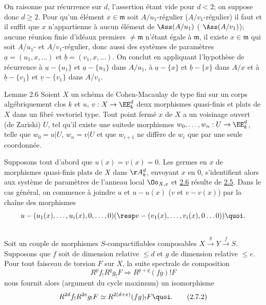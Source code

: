 On raisonne par récurrence sur $d$, l'assertion étant vide pour $d<2$;
on suppose donc $d\geq 2$. Pour qu'un élément $x\in \mathfrak{m}$ soit
$A/u_{1}$-régulier (\resp $A/v_{1}$-régulier) il faut et il
suffit que $x$ n'appartienne à aucun élément de $\Ass(A/u_{1})$ (\resp
$\Ass(A/v_{1})$); aucune réunion finie d'idéaux premiers $\neq \mathfrak{m}$
n'étant égale à $\mathfrak{m}$, il existe $x\in \mathfrak{m}$ qui soit $A/u_{1}$- et $A/v_{1}$-régulier, donc aussi des systèmes de paramètres
$\underline{a}=(u_{1},x,\ldots)$ et $\underline{b}=(v_{1},x,\ldots)$. On conclut en
appliquant l'hypothèse de récurrence à $\underline{u}-\{u_{1}\}$ et
$\underline{a}-\{u_{1}\}$ dans $A/u_{1}$, à $\underline{a}-\{x\}$ et
$\underline{b}-\{x\}$
dans $A/x$ et à $\underline{b}-\{v_{1}\}$ et $\underline{v}-\{v_{1}\}$ dans $A/v_{1}$.

\begin{enonce*}{Lemme 2.6}
Soient $X$ un schéma de Cohen-Macaulay de type fini sur un corps
algébriquement clos $k$ et $u$, $v:X\rightarrow \EE^{d}_{k}$
deux morphismes quasi-finis et plats de $X$ dans un fibré vectoriel
type. Tout point fermé $x$ de $X$ a un voisinage ouvert (de Zariski)
$U$, tel qu'il existe une suite\pageoriginale de morphismes
$w_{0},\ldots,w_{n}:U\rightarrow \EE^{d}_{k}$, telle que $w_{0}=u|U$,
$w_{n}=v|U$ et que $w_{i+1}$ ne diffère de $w_{i}$ que par une seule
coordonnée.
\end{enonce*}

Supposons tout d'abord que $u(x)=v(x)=0$. Les germes en $x$ de
morphismes quasi-finis plats de $X$ dans $\AA^{d}_{k}$,
envoyant $x$ en $0$, s'identifient alors aux système de paramètres de
l'anneau local $\Oo_{X,x}$ et \hyperref[XVIII.lem2.6]{2.6} résulte de
\hyperref[XVIII.lem2.5]{2.5}. Dans le cas
général, on commence à joindre $u$ et $u-u(x)$ (\resp $v$ et $v-v(x)$)
par la chaîne des morphismes
$$
u-(u_{1}(x),\ldots,u_{i}(x),0,\ldots,0)(\text{\resp}
v-(v_{1}(x),\ldots,v_{i}(x),0\ldots 0)){\quoi}.
$$

\setcounter{subsection}{6}
\subsection{}
Soit un couple de morphismes $S$-compactifiables composables
$X\xrightarrow{g} Y\xrightarrow{f}S$. Supposons que $f$ soit de
dimension relative $\leq d$ et $g$ de dimension relative $\leq
e$. Pour tout faisceau de torsion $F$ sur $X$, la suite spectrale de
composition
\begin{equation*}
R^{p}f_{!}R^{q}g_{!}F\Longrightarrow R^{p+q}(fg)!F\tag{2.7.1}
\end{equation*}%
nous fournit alors (argument du cycle maximum) un isomorphisme
\begin{equation*}
R^{2d}f_{!}R^{2e}g_{!}F\simeq R^{2(d+e)}(fg)_{!}F{\quoi}.\tag{2.7.2}
\end{equation*}

